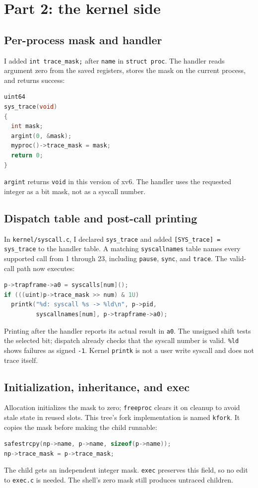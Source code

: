 \documentclass[12pt]{article}
\begin{document}
\clearpage
\section{Part 2: the kernel side}
\subsection{Per-process mask and handler}
I added \texttt{int trace\_mask;} after \texttt{name} in \texttt{struct proc}.
The handler reads argument zero from the saved registers, stores the mask
on the current process, and returns success:
\begin{lstlisting}[language=C]
uint64
sys_trace(void)
{
  int mask;
  argint(0, &mask);
  myproc()->trace_mask = mask;
  return 0;
}
\end{lstlisting}
\texttt{argint} returns \texttt{void} in this version of xv6. The handler
uses the requested integer as a bit mask, not as a syscall number.

\subsection{Dispatch table and post-call printing}
In \texttt{kernel/syscall.c}, I declared \texttt{sys\_trace} and added
\texttt{[SYS\_trace] = sys\_trace} to the handler table. A matching
\texttt{syscallnames} table names every supported call from 1 through 23,
including \texttt{pause}, \texttt{sync}, and \texttt{trace}.
The valid-call path now executes:
\begin{lstlisting}[language=C]
p->trapframe->a0 = syscalls[num]();
if (((uint)p->trace_mask >> num) & 1U)
  printk("%d: syscall %s -> %ld\n", p->pid,
         syscallnames[num], p->trapframe->a0);
\end{lstlisting}
Printing after the handler reports its actual result in \texttt{a0}.
The unsigned shift tests the selected bit; dispatch already checks that the
syscall number is valid. \texttt{\%ld} shows failures as signed \texttt{-1}.
Kernel \texttt{printk} is not a user write syscall and does not trace itself.

\subsection{Initialization, inheritance, and exec}
Allocation initializes the mask to zero; \texttt{freeproc} clears it on
cleanup to avoid stale state in reused slots. This tree's fork implementation
is named \texttt{kfork}. It copies the mask before making the child runnable:
\begin{lstlisting}[language=C]
safestrcpy(np->name, p->name, sizeof(p->name));
np->trace_mask = p->trace_mask;
\end{lstlisting}
The child gets an independent integer mask. \texttt{exec} preserves this
field, so no edit to \texttt{exec.c} is needed. The shell's zero mask still
produces untraced children.
\end{document}
